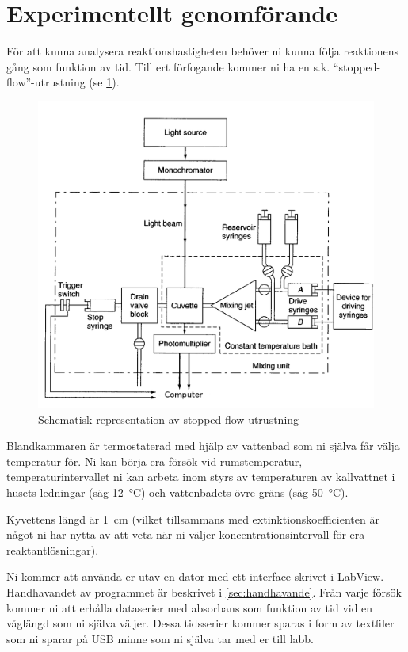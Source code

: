 \section{Experimentellt genomförande}
\label{sec:exper}
För att kunna analysera reaktionshastigheten behöver ni kunna följa
reaktionens gång som funktion av tid. Till ert förfogande kommer ni ha en
s.k. ``stopped-flow''-utrustning (se \cref{fig:stopped-flow}).

\begin{figure}[center]
  \centering
  \includegraphics[scale=0.2]{fig/stopped_flow.png}
  \caption{Schematisk representation av stopped-flow utrustning}
  \label{fig:stopped-flow}
\end{figure}

Blandkammaren är termostaterad med hjälp av vattenbad som ni själva får
välja temperatur för. Ni kan börja era försök vid
rumstemperatur, temperaturintervallet ni kan arbeta inom styrs av
temperaturen av kallvattnet i husets ledningar (säg \SI{12}{\celsius})
och vattenbadets övre gräns (säg \SI{50}{\celsius}). 

Kyvettens längd är \SI{1}{\centi\metre} (vilket
tillsammans med extinktionskoefficienten  är något ni har nytta av att
veta när ni väljer koncentrationsintervall för era reaktantlösningar).

Ni kommer att använda er utav en dator med ett interface
skrivet i LabView. Handhavandet av programmet är beskrivet i
\cref{sec:handhavande}. Från varje försök kommer ni att erhålla dataserier med
absorbans som funktion av tid vid en våglängd som ni själva väljer. Dessa
tidsserier kommer sparas i form av textfiler som ni sparar på USB minne
som ni själva tar med er till labb.

